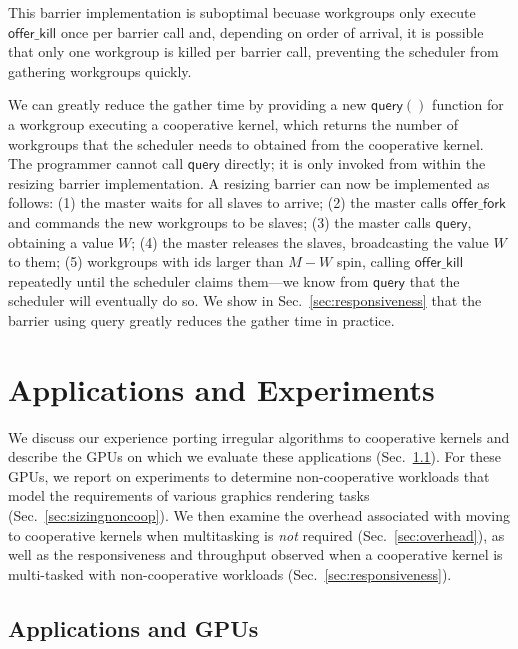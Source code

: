 \documentclass[numbers,nocopyrightspace,10pt]{sigplanconf}
\newcommand{\mysec}{Sec.~}
\newcommand{\offerfork}{\mathsf{offer\_fork}}
\newcommand{\offerkill}{\mathsf{offer\_kill}}
\newcommand{\keyword}[1]{\mathsf{#1}}
\begin{document}
This barrier implementation is suboptimal becuase workgroups only
execute $\offerkill$ once per barrier call and, depending on
order of arrival, it is possible
that only one workgroup is killed per barrier call, preventing the scheduler from gathering workgroups quickly.

We can greatly reduce the gather time by providing a new $\keyword{query}()$
function for a workgroup executing a cooperative kernel, which returns the number of workgroups that the scheduler needs to obtained
from the cooperative kernel.  
%
The programmer cannot call $\keyword{query}$ directly;
it is only invoked from within the resizing barrier implementation.
%
A resizing barrier can now be implemented
as follows: (1) the master waits for all slaves to arrive; (2) the master calls $\offerfork$ and
commands the new workgroups to be slaves; (3) the master calls $\keyword{query}$, obtaining a value $W$;
(4) the master releases the slaves, broadcasting the value $W$ to them; (5) workgroups with ids larger than $M-W$ spin, calling 
$\offerkill$ repeatedly until the scheduler claims them---we know from $\keyword{query}$ that the scheduler will eventually do so.
We show in \mysec\ref{sec:responsiveness} that the barrier using
query greatly reduces the gather time in practice.


\section{Applications and Experiments}\label{sec:experiments}

We discuss our experience porting irregular algorithms to cooperative kernels and describe the GPUs on which we evaluate these applications (\mysec\ref{sec:portingalgorithms}).  For these GPUs, we report on experiments to determine non-cooperative workloads that model the requirements of various graphics rendering tasks (\mysec\ref{sec:sizingnoncoop}).  We then examine the overhead associated with moving to cooperative kernels when multitasking is \emph{not} required (\mysec\ref{sec:overhead}), as well as the responsiveness and throughput observed when a cooperative kernel is multi-tasked with non-cooperative workloads (\mysec\ref{sec:responsiveness}).

\subsection{Applications and GPUs}\label{sec:portingalgorithms}
\end{document}
